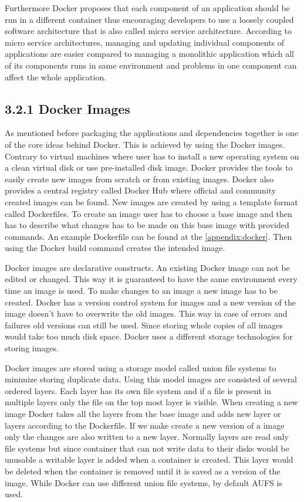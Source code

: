 \documentclass[12pt,oneandhalf,chaparabic,ceng,ms,eng,oneside,pntc]{gsufbe}
\begin{document}
Furthermore Docker proposes that each component of an application should be run in a 
different container thus encouraging developers to use a loosely coupled software architecture that is 
also called micro service architecture.  According to micro service architectures, managing and updating
individual components of applications are easier compared to managing a monolithic application which
all of its components runs in same environment and problems in one component can affect the whole
application.

\subsection[Docker Images]{3.2.1 Docker Images}
As mentioned before packaging the applications and dependencies together is one of the core ideas
behind Docker.  This is achieved by using the Docker images.  Contrary to virtual machines where user
has to install a new operating system on a clean virtual disk or use pre-installed disk image.  Docker 
provides the tools to easily create new images from scratch or from existing images.  Docker also
provides a central registry called Docker Hub where official and community created images can be found.
New images are created by using a template format called Dockerfiles.  To create an image user has to
choose a base image and then has to describe what changes has to be made on this base image with
provided commands.  An example Dockerfile can be found at the \ref{appendix:docker}.  Then using the
Docker build command creates the intended image.

Docker images are declarative constructs.  An existing Docker image can not be edited or changed.  This
way it is guaranteed to have the same environment every time an image is used.  To make changes to an
image a new image has to be created.  Docker has a version control system for images and a new version
of the image doesn't have to overwrite the old images.  This way in case of errors and failures old
versions can still be used.  Since storing whole copies of all images would take too much disk space.
Docker uses a different storage technologies for storing images.

Docker images are stored using a storage model called union file systems to minimize storing duplicate
data.  Using this model images are consisted of several ordered layers.  Each layer has its own file
system and if a file is present in multiple layers only the file on the top most layer is visible.  When
creating a new image Docker takes all the layers from the base image and adds new layer or layers
according to the Dockerfile.  If we make create a new version of a image only the changes are also 
written to a new layer.  Normally layers are read only file systems but since container that can not
write data to their disks would be unusable a writable layer is added when a container is created.  This
layer would be deleted when the container is removed until it is saved as a version of the image.
While Docker can use different union file systems, by default AUFS is used.
\end{document}
